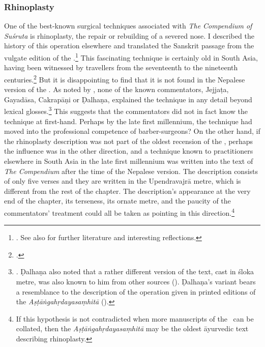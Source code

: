 \subsubsection{Rhinoplasty}
\label{sec:rhinoplasty}

One of the best-known surgical techniques associated with \emph{The 
Compendium of
    Suśruta} is rhinoplasty, the repair or rebuilding of a severed nose. I described
the history of this operation elsewhere and translated the Sanskrit passage from
the vulgate edition of the \SS.\footnote{\cite[67--70, 99--100]{wuja-2003}. See
also \cite[IB, 327--328, note 186]{meul-hist} for further literature and
interesting reflections.}  This fascinating technique is certainly old in South
Asia, having been witnessed by travellers from the seventeenth to the nineteenth
centuries.\footcites[ii.301]{manu-stor}[352--3]{thor-bann} But it is disappointing
to find that it is not found in the Nepalese version of the \SS.  As noted by
\citeauthor{meul-hist}, none of the known commentators, Jejjaṭa, Gayadāsa,
Cakrapāṇi or Ḍalhaṇa, explained the technique in any detail beyond lexical
glosses.\footnote{\cite[IB, 328]{meul-hist}. Ḍalhaṇa also noted that a rather
different version of the text, cast in śloka metre, was also known to him from
other sources ().  Ḍalhaṇa's variant bears a resemblance to
the description of the operation given in printed editions of the
\emph{Aṣṭāṅgahṛdayasaṃhitā} ().} %
This suggests that the commentators did not in fact know the technique at
first-hand. Perhaps by the late first millennium, the technique had moved into the
professional competence of barber-surgeons? On the other hand, if the rhinoplasty
description was not part of the oldest recension of the \SS, perhaps the influence
was in the other direction, and a technique known to practitioners elsewhere in
South Asia in the late first millennium was written into the text of \emph{The
    Compendium} after the time of the Nepalese version. The description consists 
    of
only five verses and they are written in the Upendravajrā metre, which is
different from the rest of the chapter.  The description's appearance at the very
end of the chapter, its terseness, its ornate metre, and the
paucity of the commentators' treatment could all be taken as pointing in this
direction.\footnote{If this hypothesis is not contradicted when more manuscripts 
of the \SS\ can be collated, then the \emph{Aṣṭāṅgahṛdayasaṃhitā} may be the 
oldest āyurvedic text describing rhinoplasty.}


